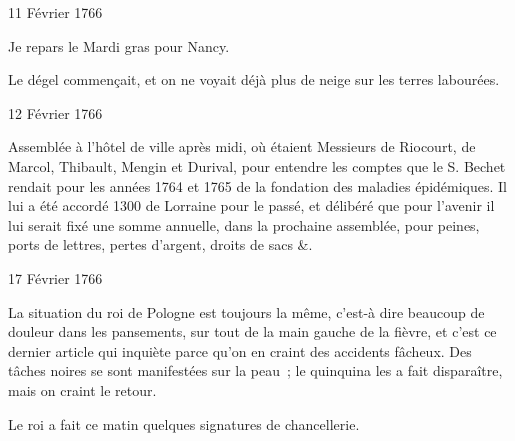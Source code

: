                      \begin{diary}{11 Février 1766}{}
                        
                         Je repars le Mardi gras pour Nancy. \bigskip
        
        
                         Le dégel commençait, et on ne
                           voyait
                           déjà plus de neige sur les terres labourées. \bigskip
        
        
                     \end{diary}

                     \begin{diary}{12 Février 1766}{}
                        
                         Assemblée à l'hôtel de ville après midi,
                           où étaient Messieurs
                           de Riocourt, de Marcol,
                           Thibault, Mengin et Durival, pour
                           entendre les comptes que le S.
                              Bechet rendait
                           pour les années 1764 et 1765 de la
                              fondation des maladies épidémiques.
                           Il lui a été accordé
                           1300 de Lorraine
                           pour le passé, et délibéré que pour
                           l'avenir il lui serait fixé une somme
                           annuelle, dans la prochaine assemblée,
                           pour peines, ports de lettres, pertes
                           d'argent, droits de sacs &. \bigskip
        
        
                     \end{diary}
                     
                     

                     \begin{diary}{17 Février 1766}{}
                        
                         La situation du roi de Pologne est toujours la
                           même, c'est-à dire beaucoup de douleur dans
                           les pansements, sur tout de la main gauche
                           de la fièvre, et c'est ce dernier article qui
                           inquiète parce qu'on en craint des accidents
                           fâcheux. Des tâches noires se sont manifestées
                           sur la peau ; le quinquina
                           les a fait
                           disparaître, mais on craint le retour. \bigskip
        
        
                        
                           Le roi a fait ce matin quelques
                           signatures
                           de chancellerie. \bigskip
        
        
                     \end{diary}

